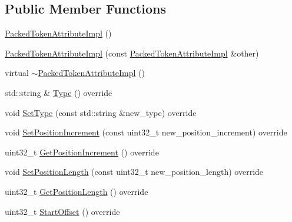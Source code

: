 \subsection*{Public Member Functions}
\begin{DoxyCompactItemize}
\item 
\mbox{\hyperlink{classlucene_1_1core_1_1analysis_1_1tokenattributes_1_1PackedTokenAttributeImpl_a11dff73c5a672c0fc89c2f69b5d6366d}{Packed\+Token\+Attribute\+Impl}} ()
\item 
\mbox{\hyperlink{classlucene_1_1core_1_1analysis_1_1tokenattributes_1_1PackedTokenAttributeImpl_a7f5ec442110c91b403513caa53691da4}{Packed\+Token\+Attribute\+Impl}} (const \mbox{\hyperlink{classlucene_1_1core_1_1analysis_1_1tokenattributes_1_1PackedTokenAttributeImpl}{Packed\+Token\+Attribute\+Impl}} \&other)
\item 
virtual \mbox{\hyperlink{classlucene_1_1core_1_1analysis_1_1tokenattributes_1_1PackedTokenAttributeImpl_affb00f4d610f5827e13a8ede6ff081a7}{$\sim$\+Packed\+Token\+Attribute\+Impl}} ()
\item 
std\+::string \& \mbox{\hyperlink{classlucene_1_1core_1_1analysis_1_1tokenattributes_1_1PackedTokenAttributeImpl_ab9c0b48ded43a3c377136210dcbda215}{Type}} () override
\item 
void \mbox{\hyperlink{classlucene_1_1core_1_1analysis_1_1tokenattributes_1_1PackedTokenAttributeImpl_ad5f1b7e5437154dada3da8cc4f89c642}{Set\+Type}} (const std\+::string \&new\+\_\+type) override
\item 
void \mbox{\hyperlink{classlucene_1_1core_1_1analysis_1_1tokenattributes_1_1PackedTokenAttributeImpl_a657933594f71883a7271bca05363bc2a}{Set\+Position\+Increment}} (const uint32\+\_\+t new\+\_\+position\+\_\+increment) override
\item 
uint32\+\_\+t \mbox{\hyperlink{classlucene_1_1core_1_1analysis_1_1tokenattributes_1_1PackedTokenAttributeImpl_aeeb6d5e17fb510c402e36d50e39bb9fb}{Get\+Position\+Increment}} () override
\item 
void \mbox{\hyperlink{classlucene_1_1core_1_1analysis_1_1tokenattributes_1_1PackedTokenAttributeImpl_a3d721b90985cf600d2d44bb5f156d05d}{Set\+Position\+Length}} (const uint32\+\_\+t new\+\_\+position\+\_\+length) override
\item 
uint32\+\_\+t \mbox{\hyperlink{classlucene_1_1core_1_1analysis_1_1tokenattributes_1_1PackedTokenAttributeImpl_a4b5a93a1d9b61cf1504b382d24c1e6d9}{Get\+Position\+Length}} () override
\item 
uint32\+\_\+t \mbox{\hyperlink{classlucene_1_1core_1_1analysis_1_1tokenattributes_1_1PackedTokenAttributeImpl_aea927563f771802e2ea6356814b53c17}{Start\+Offset}} () override

\end{DoxyCompactItemize}
